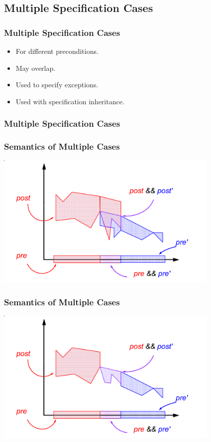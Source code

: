 \subsection[Spec Cases]{Multiple Specification Cases}

\begin{frame}
\frametitle{Multiple Specification Cases}

\begin{itemize}
\item
For different preconditions.

\item
May overlap.

\item
Used to specify exceptions.

\item
Used with specification inheritance.
\end{itemize}
\end{frame}

\begin{frame}
\frametitle{Multiple Specification Cases}

\end{frame}

\begin{frame}
\frametitle{Semantics of Multiple Cases}
\transdissolve[duration=0.5]
\includegraphics[width=4.25in]{join-both}
\end{frame}

\begin{frame}
\frametitle{Semantics of Multiple Cases}
\includegraphics[width=4.25in]{join-intersect}
\end{frame}

